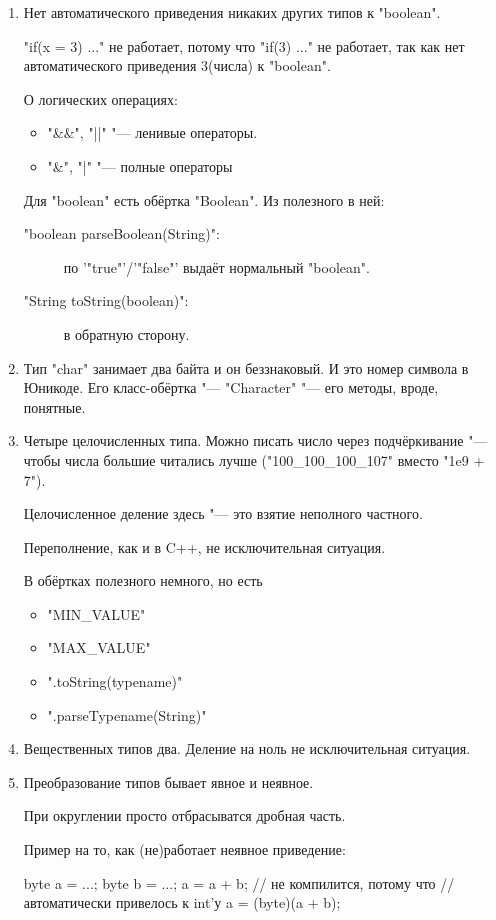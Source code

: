 \begin{enumerate}
\item
	Нет автоматического приведения никаких других типов к \java"boolean".

	\java"if(x = 3) {...}" не работает, потому что \java"if(3) {...}" не работает,
	так как нет автоматического приведения $3$(числа) к \java"boolean".

	О логических операциях:
	\begin{itemize}
		\item \java"&&", \java"||" "--- ленивые операторы.
		\item \java"&", \java"|" "--- полные операторы
	\end{itemize}

	Для \java"boolean" есть обёртка \java"Boolean".
	Из полезного в ней:
	\begin{description}
		\item[\java"boolean parseBoolean(String)":] по \java'"true"'/\java'"false"' выдаёт нормальный \java"boolean".
		\item[\java"String toString(boolean)":] в обратную сторону.
	\end{description}

\item
	Тип \java"char" занимает два байта и он беззнаковый.
	И это номер символа в Юникоде.
	Его класс-обёртка "--- \java"Character" "--- его методы, вроде, понятные.

\item
	Четыре целочисленных типа.
	Можно писать число через подчёркивание "--- чтобы числа большие читались лучше (\java"100_100_100_107" вместо \cpp"1e9 + 7").

	Целочисленное деление здесь "--- это взятие неполного частного.

	Переполнение, как и в C++, не исключительная ситуация.

	В обёртках полезного немного, но есть
	\begin{itemize}
		\item \java"MIN_VALUE"
		\item \java"MAX_VALUE"
		\item \java".toString(typename)"
		\item \java".parseTypename(String)"
	\end{itemize}

\item
	Вещественных типов два.
	Деление на ноль не исключительная ситуация.

\item
	Преобразование типов бывает явное и неявное.

	При округлении просто отбрасыватся дробная часть.

	Пример на то, как (не)работает неявное приведение:
	\begin{javacode}
	byte a = ...;
	byte b = ...;
	a = a + b; // не компилится, потому что
	           // автоматически привелось к int'у
	a = (byte)(a + b);
	\end{javacode}
\end{enumerate}

